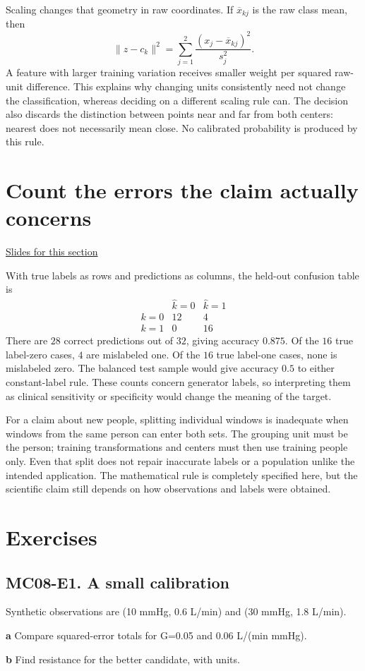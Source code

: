 \documentclass[11pt,letterpaper]{article}
\theoremstyle{definition}\newtheorem{definition}{Definition}\newtheorem{example}{Example}
\numberwithin{equation}{section}
\begin{document}
Scaling changes that geometry in raw coordinates. If $\overline x_{kj}$ is the raw class mean, then
\[\|z-c_k\|^2=\sum_{j=1}^2\frac{(x_j-\overline x_{kj})^2}{s_j^2}.
\]
A feature with larger training variation receives smaller weight per squared raw-unit difference. This explains why changing units consistently need not change the classification, whereas deciding on a different scaling rule can. The decision also discards the distinction between points near and far from both centers: nearest does not necessarily mean close. No calibrated probability is produced by this rule.
\section{Count the errors the claim actually concerns}
\hypertarget{note-count-the-errors-the-claim-actually-concerns}{}\label{note:count-the-errors-the-claim-actually-concerns}
{\small \href{slides.html\#frame=read-both-directions-of-error\&step=1}{Slides for this section}}\par
With true labels as rows and predictions as columns, the held-out confusion table is
\[
\begin{array}{c|rr}
&\widehat k=0&\widehat k=1\\\hline
k=0&12&4\\
k=1&0&16
\end{array}
\]
There are $28$ correct predictions out of $32$, giving accuracy $0.875$. Of the $16$ true label-zero cases, $4$ are mislabeled one. Of the $16$ true label-one cases, none is mislabeled zero. The balanced test sample would give accuracy $0.5$ to either constant-label rule. These counts concern generator labels, so interpreting them as clinical sensitivity or specificity would change the meaning of the target.

For a claim about new people, splitting individual windows is inadequate when windows from the same person can enter both sets. The grouping unit must be the person; training transformations and centers must then use training people only. Even that split does not repair inaccurate labels or a population unlike the intended application. The mathematical rule is completely specified here, but the scientific claim still depends on how observations and labels were obtained.
\bigskip
\section*{Exercises}
\par\noindent\begin{minipage}{\linewidth}
\subsection*{MC08-E1. A small calibration}
Synthetic observations are (10 mmHg, 0.6 L/min) and (30 mmHg, 1.8 L/min).

\textbf{a} Compare squared-error totals for G=\allowbreak{}0.05 and 0.06 L/(min mmHg).

\end{minipage}\par\medskip
\textbf{b} Find resistance for the better candidate, with units.
\end{document}
